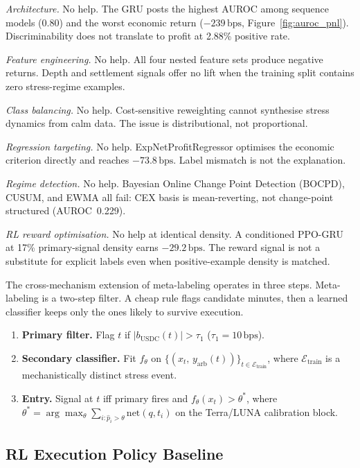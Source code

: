 \documentclass[sigconf,anonymous,natbib=false]{acmart}
\newcommand{\bps}{\,\text{bps}}
\begin{document}
\textit{Architecture.} No help.
The GRU posts the highest AUROC among sequence models (0.80) and
the worst economic return ($-239\bps$, Figure~\ref{fig:auroc_pnl}).
Discriminability does not translate to profit at 2.88\% positive rate.

\textit{Feature engineering.} No help.
All four nested feature sets produce negative returns.
Depth and settlement signals offer no lift when the training split
contains zero stress-regime examples.

\textit{Class balancing.} No help.
Cost-sensitive reweighting cannot synthesise stress dynamics from calm
data. The issue is distributional, not proportional.

\textit{Regression targeting.} No help.
ExpNetProfitRegressor optimises the economic criterion directly and
reaches $-73.8\bps$. Label mismatch is not the explanation.

\textit{Regime detection.} No help.
Bayesian Online Change Point Detection (BOCPD), CUSUM, and EWMA all fail:
CEX basis is mean-reverting, not change-point structured (AUROC~0.229).

\textit{RL reward optimisation.} No help at identical density.
A conditioned PPO-GRU at 17\% primary-signal density earns
$-29.2\bps$. The reward signal is not a substitute for explicit
labels even when positive-example density is matched.

The cross-mechanism extension of meta-labeling operates in three steps.
Meta-labeling \cite{lopezdeprado2018} is a two-step filter. A cheap
rule flags candidate minutes, then a learned classifier keeps only the
ones likely to survive execution.
\begin{enumerate}[leftmargin=*,itemsep=1pt,topsep=2pt]
  \item \textbf{Primary filter.} Flag $t$ if
        $|b_{\text{USDC}}(t)|>\tau_1$ ($\tau_1{=}10\bps$).
  \item \textbf{Secondary classifier.} Fit $f_\theta$ on
        $\{(x_t,\,y_{\text{arb}}(t))\}_{t\in\mathcal{E}_{\text{train}}}$,
        where $\mathcal{E}_{\text{train}}$ is a mechanistically distinct
        stress event.
  \item \textbf{Entry.} Signal at $t$ iff primary fires
        and $f_\theta(x_t)>\theta^*$, where
        $\theta^* = \arg\max_\theta \sum_{i:\hat{p}_i>\theta}
        \text{net}(q,t_i)$ on the Terra/LUNA calibration block.
\end{enumerate}

\subsection{RL Execution Policy Baseline}
\label{sec:rl_baseline}
\end{document}

